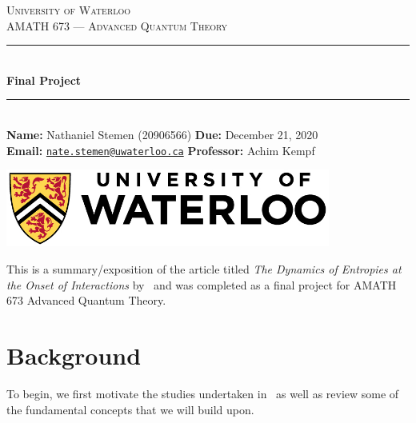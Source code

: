 \documentclass[11pt,english]{article}
\theoremstyle{definition}
\begin{document}
\begin{titlepage}
	\newcommand{\HRule}{\rule{\linewidth}{0.5mm}}

	\begin{center}

		\textsc{\LARGE University of Waterloo}\\[1.5cm]

		\textsc{\large AMATH 673 --- Advanced Quantum Theory}\\[0.75cm]

		\HRule{}\\[0.4cm]

		{\huge\bfseries Final Project}\\[0.15cm]

		\HRule{}\\[1cm]

		{\large
		\textbf{Name:} Nathaniel Stemen (20906566)\hspace{\fill} \textbf{Due:} December 21, 2020 \\
		\textbf{Email:} \href{mailto:nate.stemen@uwaterloo.ca}{\texttt{nate.stemen@uwaterloo.ca}} \hspace{\fill} \textbf{Professor:} Achim Kempf
		}

		\vfill
		\includegraphics[width=0.8\textwidth]{uwlogo.jpg}\\[1cm]
	\end{center}
\end{titlepage}

\begingroup
{}
\hypersetup{linkcolor=darkblue}
\tableofcontents
\endgroup


\vspace{0.5cm}
This is a summary/exposition of the article titled \emph{The Dynamics of Entropies at the Onset of Interactions} by~\citeauthor{dynamic-entropies} and was completed as a final project for AMATH 673 Advanced Quantum Theory.

\section{Background}
To begin, we first motivate the studies undertaken in~\cite{dynamic-entropies} as well as review some of the fundamental concepts that we will build upon.
\end{document}
